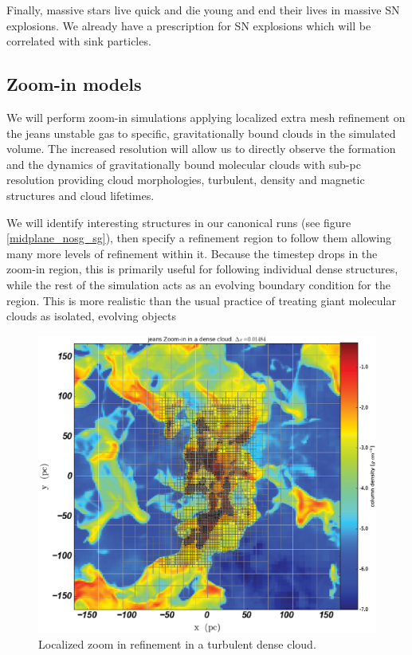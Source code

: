 \documentclass[12pt,a4paper]{article}
\begin{document}
Finally, massive stars live quick and die young and end their lives in massive SN explosions.
We already have a prescription for SN explosions which will be correlated with sink particles.
	
\subsection{Zoom-in models}
	
We will perform zoom-in simulations applying localized extra mesh refinement on the jeans unstable gas to specific, gravitationally bound clouds in the simulated volume.
The increased resolution will allow us to directly observe the formation and the dynamics of gravitationally bound molecular clouds with sub-pc resolution providing cloud morphologies, turbulent, density and magnetic structures and cloud lifetimes.
	
We will identify interesting structures in our canonical runs (see figure \ref{midplane_nosg_sg}), then specify a refinement region to follow them allowing many more levels of refinement within it.
Because the timestep drops in the zoom-in region, this is primarily useful for following individual dense structures, while the rest of the simulation acts as an evolving boundary condition for the region.
This is more realistic than the usual practice of treating giant molecular clouds as isolated, evolving objects \citep{Dale2014, Girichidis2011, Bate2009}
	
\begin{figure}
	\centering
	\includegraphics[scale=0.4]{Figures/DenseCloud_ZoomIn_wGrid.eps} 
	\caption{Localized zoom in refinement in a turbulent dense cloud.}	
	\label{Zoom-in_cloud}
\end{figure}
	
\end{document}
